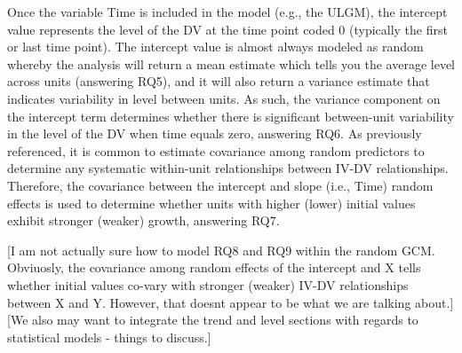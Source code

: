 \documentclass[english,,man]{apa6}
\theoremstyle{definition}
\theoremstyle{definition}
\theoremstyle{definition}
\theoremstyle{remark}
\begin{document}
Once the variable Time is included in the model (e.g., the ULGM), the
intercept value represents the level of the DV at the time point coded 0
(typically the first or last time point). The intercept value is almost
always modeled as random whereby the analysis will return a mean
estimate which tells you the average level across units (answering RQ5),
and it will also return a variance estimate that indicates variability
in level between units. As such, the variance component on the intercept
term determines whether there is significant between-unit variability in
the level of the DV when time equals zero, answering RQ6. As previously
referenced, it is common to estimate covariance among random predictors
to determine any systematic within-unit relationships between IV-DV
relationships. Therefore, the covariance between the intercept and slope
(i.e., Time) random effects is used to determine whether units with
higher (lower) initial values exhibit stronger (weaker) growth,
answering RQ7.

{[}I am not actually sure how to model RQ8 and RQ9 within the random
GCM. Obviuosly, the covariance among random effects of the intercept and
X tells whether initial values co-vary with stronger (weaker) IV-DV
relationships between X and Y. However, that doesnt appear to be what we
are talking about.{]} {[}We also may want to integrate the trend and
level sections with regards to statistical models - things to
discuss.{]}
\end{document}
